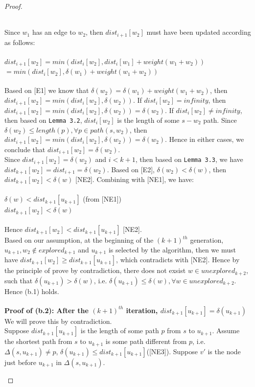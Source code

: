\begin{proof}
\begin{itemize}
  \\
  Since $w_1$ has an edge to $w_2$, then $dist_{i+1}[w_2]$ must have been updated according as follows: 
  \\\\
  \tab\tab $dist_{i+1}[w_2] = min(dist_i[w_2], dist_i[w_1] + weight(w_1 + w_2))$ \\
  \tab\tab\tab $= min(dist_i[w_2], \delta(w_1) + weight(w_1 + w_2))$
  \\\\
  Based on [E1] we know that $\delta(w_2) =  \delta(w_1) + weight(w_1 + w_2)$, then $dist_{i+1}[w_2] = min(dist_i[w_2], \delta(w_2))$. If $dist_i[w_2] = infinity$, then $dist_{i+1}[w_2] = min(dist_i[w_2], \delta(w_2)) = \delta(w_2)$. If $dist_i[w_2] \neq infinity$, then based on \texttt{Lemma 3.2}, $dist_i[w_2]$ is the length of some $s-w_2$ path. Since $\delta(w_2) \leq length(p), \forall p \in path(s, w_2)$, then $dist_{i+1}[w_2] = min(dist_i[w_2], \delta(w_2)) = \delta(w_2)$. Hence in either cases, we conclude that $dist_{i+1}[w_2] = \delta(w_2)$. 
  \\
  Since $dist_{i+1}[w_2] = \delta(w_2)$ and $i < k+1$, then based on \texttt{Lemma 3.3}, we have $dist_{k+1}[w_2] = dist_{i+1} = \delta(w_2)$. Based on [E2], $\delta(w_2) < \delta(w)$, then $dist_{k+1}[w_2] < \delta(w)$ [NE2]. Combining with [NE1], we have: 
  \\\\
  \ftab $\delta(w) < dist_{k+1}[u_{k+1}]$ (from [NE1])\\
  \ftab $dist_{k+1}[w_2] < \delta(w)$ 
  \\\\
  Hence $dist_{k+1}[w_2] < dist_{k+1}[u_{k+1}]$ [NE2]. 
  \\
  Based on our assumption, at the beginning of the $(k+1)^{th}$ generation, $u_{k+1}, w_2 \notin explored_{k+1}$ and $u_{k+1}$ is selected by the algorithm, then we must have $dist_{k+1}[w_2] \geq dist_{k+1}[u_{k+1}]$, which contradicts with [NE2]. Hence by the principle of prove by contradiction, there does not exsist $w \in unexplored_{k+2}$, such that $\delta(u_{k+1}) > \delta(w)$, i.e. $\delta(u_{k+1}) \leq \delta(w), \forall w \in unexplored_{k+2}$. Hence (b.1) holds. 
  \\\\
  \textbf{Proof of (b.2): After the $(k+1)^{th}$ iteration, $dist_{k+1}[u_{k+1}] = \delta(u_{k+1})$}
  \\
  We will prove this by contradiction. 
  \\
  Suppose $dist_{k+1}[u_{k+1}]$ is the length of some path $p$ from $s$ to $u_{k+1}$. Assume the shortest path from $s$ to $u_{k+1}$ is some path different from $p$, i.e. $\Delta(s, u_{k+1}) \neq p$, $\delta(u_{k+1}) \leq dist_{k+1}[u_{k+1}]$([NE3]). Suppose $v'$ is the node just before $u_{k+1}$ in $\Delta(s, u_{k+1})$. 

\end{itemize}
\end{proof}
